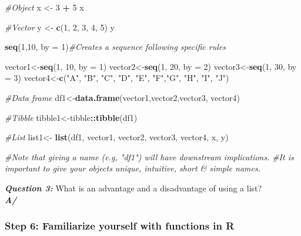 \documentclass[]{article}
\newenvironment{Shaded}{\begin{snugshade}}{\end{snugshade}}
\newcommand{\CommentTok}[1]{\textcolor[rgb]{0.56,0.35,0.01}{\textit{#1}}}
\newcommand{\DataTypeTok}[1]{\textcolor[rgb]{0.13,0.29,0.53}{#1}}
\newcommand{\DecValTok}[1]{\textcolor[rgb]{0.00,0.00,0.81}{#1}}
\newcommand{\KeywordTok}[1]{\textcolor[rgb]{0.13,0.29,0.53}{\textbf{#1}}}
\newcommand{\NormalTok}[1]{#1}
\newcommand{\OperatorTok}[1]{\textcolor[rgb]{0.81,0.36,0.00}{\textbf{#1}}}
\newcommand{\StringTok}[1]{\textcolor[rgb]{0.31,0.60,0.02}{#1}}
\begin{document}
\begin{Shaded}
\begin{Highlighting}[]
\CommentTok{#Object}
\NormalTok{x <-}\StringTok{ }\DecValTok{3} \OperatorTok{+}\StringTok{ }\DecValTok{5}
\NormalTok{x}

\CommentTok{#Vector}
\NormalTok{y <-}\StringTok{ }\KeywordTok{c}\NormalTok{(}\DecValTok{1}\NormalTok{, }\DecValTok{2}\NormalTok{, }\DecValTok{3}\NormalTok{, }\DecValTok{4}\NormalTok{, }\DecValTok{5}\NormalTok{) }
\NormalTok{y}

\KeywordTok{seq}\NormalTok{(}\DecValTok{1}\NormalTok{,}\DecValTok{10}\NormalTok{, }\DataTypeTok{by =} \DecValTok{1}\NormalTok{)}\CommentTok{#Creates a sequence following specific rules }

\NormalTok{vector1<-}\KeywordTok{seq}\NormalTok{(}\DecValTok{1}\NormalTok{, }\DecValTok{10}\NormalTok{,  }\DataTypeTok{by =} \DecValTok{1}\NormalTok{)}
\NormalTok{vector2<-}\KeywordTok{seq}\NormalTok{(}\DecValTok{1}\NormalTok{, }\DecValTok{20}\NormalTok{, }\DataTypeTok{by =} \DecValTok{2}\NormalTok{)}
\NormalTok{vector3<-}\KeywordTok{seq}\NormalTok{(}\DecValTok{1}\NormalTok{, }\DecValTok{30}\NormalTok{,  }\DataTypeTok{by =} \DecValTok{3}\NormalTok{)}
\NormalTok{vector4<-}\KeywordTok{c}\NormalTok{(}\StringTok{"A"}\NormalTok{, }\StringTok{"B"}\NormalTok{, }\StringTok{"C"}\NormalTok{, }\StringTok{"D"}\NormalTok{, }\StringTok{"E"}\NormalTok{, }\StringTok{"F"}\NormalTok{,}\StringTok{"G"}\NormalTok{, }\StringTok{"H"}\NormalTok{, }\StringTok{"I"}\NormalTok{, }\StringTok{"J"}\NormalTok{)}

\CommentTok{#Data frame}
\NormalTok{df1<-}\KeywordTok{data.frame}\NormalTok{(vector1,vector2,vector3, vector4)}

\CommentTok{#Tibble}
\NormalTok{tibble1<-tibble}\OperatorTok{::}\KeywordTok{tibble}\NormalTok{(df1)}

\CommentTok{#List}
\NormalTok{list1<-}\StringTok{ }\KeywordTok{list}\NormalTok{(df1, vector1, vector2, vector3, vector4, x, y) }

\CommentTok{#Note that giving a name (e.g, "df1") will have downstream implications.}
\CommentTok{#It is important to give your objects unique, intuitive, short & simple names.}
\end{Highlighting}
\end{Shaded}

\textbf{\emph{Question 3:}} What is an advantage and a disadvantage of
using a list?\\
\textbf{\emph{A/}}

\hypertarget{step-6-familiarize-yourself-with-functions-in-r}{%
\subsubsection{Step 6: Familiarize yourself with functions in
R}\label{step-6-familiarize-yourself-with-functions-in-r}}
\end{document}

